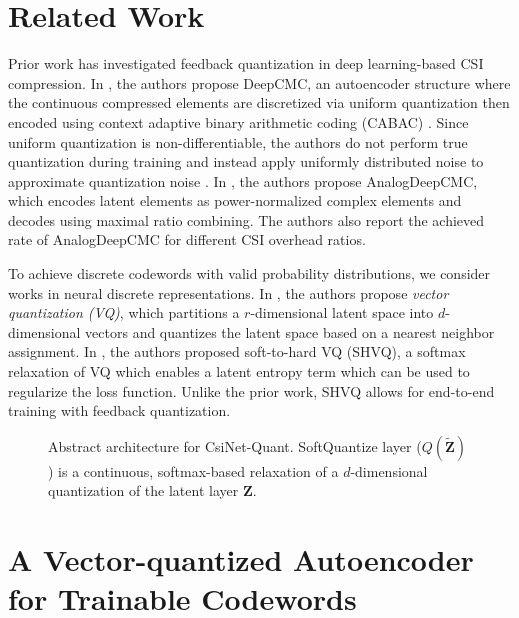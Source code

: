 \section{Related Work}

Prior work has investigated feedback quantization in deep learning-based CSI compression. In \cite{ref:Yang2019DeepCMC}, the authors propose DeepCMC, an autoencoder structure where the continuous compressed elements are discretized via uniform quantization then encoded using context adaptive binary arithmetic coding (CABAC) \cite{ref:Marpe2003CABAC}. Since uniform quantization is non-differentiable, the authors do not perform true quantization during training and instead apply uniformly distributed noise to approximate quantization noise \cite{ref:Yang2019DeepCMC}. In \cite{ref:Mashhadi2020AnalogDeepCMC}, the authors propose AnalogDeepCMC, which encodes latent elements as power-normalized complex elements and decodes using maximal ratio combining. The authors also report the achieved rate of AnalogDeepCMC for different CSI overhead ratios.

To achieve discrete codewords with valid probability distributions, we consider works in neural discrete representations. In \cite{ref:Oord2017Neural}, the authors propose \emph{vector quantization (VQ)}, which partitions a $r$-dimensional latent space into $d$-dimensional vectors and quantizes the latent space based on a nearest neighbor assignment. In \cite{ref:Agustsson2017SoftToHard}, the authors proposed soft-to-hard VQ (SHVQ), a softmax relaxation of VQ which enables a latent entropy term which can be used to regularize the loss function.  Unlike the prior work, SHVQ allows for end-to-end training with feedback quantization.

\begin{figure}[!hbtp]
\centering
\def\svgwidth{0.8\columnwidth}

\caption{Abstract architecture for CsiNet-Quant. SoftQuantize layer ($Q(\tilde{\mathbf Z})$) is a continuous, softmax-based relaxation of a $d$-dimensional quantization of the latent layer $\mathbf Z$.}
\label{fig:csinet_quant}
\end{figure}

\section{A Vector-quantized Autoencoder for Trainable Codewords}

